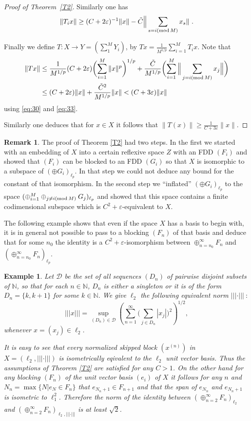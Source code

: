 \documentclass[11pt,leqno]{amsart}
\newtheorem{example}[thm]{Example}
\theoremstyle{definition}
\newtheorem*{remark}{Remark}
\def\mod{\mathop{\rm mod}\nolimits}
\newcommand{\vp}{\varepsilon}
\newcommand{\tC}{\tilde C}
\newcommand{\cD}{\mathcal{D}}
\newcommand{\N}{\mathbb{N}}
\begin{document}
\begin{proof}[Proof of Theorem~\ref{T2}]
Similarly one has 
$$\| T_ix\| \ge (C+2\vp)^{-1} \|x\| - \tC \Big\|\sum_{s=i(\mod M)} x_s\|\ .$$

Finally we define $T:X\to Y = (\sum_1^M Y_i)$, by 
$Tx = \frac1{M^{1/p}} \sum_{i=1}^M T_ix$. 
Note that 
\begin{align*}
\|Tx\| & \le \frac1{M^{1/p}} (C+2\vp) 
\biggl( \sum_{i=1}^M \|x\|^p\biggr)^{1/p} 
+ \frac{\tC}{M^{1/p}} 
\biggl( \sum_{i=1}^M \Big\|\sum_{j=i(\mod M)} x_j\Big\|\biggr)\\
&\le (C+2\vp) \|x\| + \frac{\tC^2}{M^{1/p}} \|x\| 
< (C+3\vp) \|x\|
\end{align*}
using \eqref{eq:30} and \eqref{eq:33}. 

Similarly one deduces that for $x\in X$ it follows that 
 $\|T(x)\|\ge \frac1{C+3\vp}\|x\|$.
\end{proof}


\begin{remark} 
The proof of Theorem \ref{T2} had two steps. 
In the first we started with an embedding of $X$ into a certain 
reflexive space $Z$ with an FDD $(F_i)$ and showed that $(F_i)$ can be blocked
to an FDD $(G_i)$ so that $X$ is isomorphic to a subspace of 
$(\oplus G_i)_{\ell_p}$. In that step we could not
deduce any bound for the constant of that isomorphism. 
In the second step we  ``inflated'' $(\oplus G_i)_{\ell_p}$ to the space
$(\oplus_{i=1}^M\oplus_{j\not=i(\mod M)} G_j)_{\ell_p}$ and showed that 
this space contains
a finite codimensional subspace which is $C^2+\vp$-equivalent to $X$.
   
The following example  shows that even if the space 
$X$ has a basis to begin with, it is in general not possible
to pass to a blocking $(F_n)$ of that basis and deduce that 
for some $n_0$ the identity is a $C^2+\vp$-isomorphism between
$\oplus_{n=n_0}^\infty F_n$ and $(\oplus_{n=n_0}^\infty F_n)_{\ell_p}$. 
\end{remark}
    
\begin{example} 
Let $\cD$ be the set of all  sequences $(D_n)$ of pairwise 
disjoint subsets of $\N$, 
so that  for each $n\in\N$, $D_n$ is either a singleton
or it is of the form $D_n=\{k,k+1\}$ for some $k\in\N$.
We give $\ell_2$ the following equivalent norm $|||\cdot|||\ :$
$$|||x|||=\sup_{(D_n)\in\cD} \left(\sum_{n=1}^\infty
\Biggl(\sum_{j\in D_n} |x_j|\Biggr)^2\right)^{1/2},$$
whenever $x=(x_j)\in\ell_2$.
     
It is easy to see that every  normalized skipped block 
$(x^{(n)})$ in $X=(\ell_2,|||\cdot|||)$ is
isometrically eqivalent to the $\ell_2$ unit vector basis. 
Thus the assumptions of Theorem \ref{T2} are satisfied for any $C>1$. 
On the other hand for any blocking $(F_n)$ of the unit vector basis 
$(e_i)$ of $X$ it follows
for any $n$  and $N_n=\max\{N|e_N\in F_n\}$ that 
$e_{N_n+1}\in F_{n+1}$ and that 
the span of $e_{N_n}$ and $e_{N_n+1}$ is isometric to $\ell^2_1$. 
Therefore the norm of the identity  between 
$(\oplus_{n=2}^\infty F_n)_{\ell_2}$ and 
$(\oplus_{n=2}^\infty F_n)_{\ell_2,|||\cdot|||}$ is at least $\sqrt 2$. 
\end{example}
    
\end{document}
